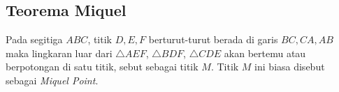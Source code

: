 \subsection{Teorema Miquel}
    Pada segitiga $ABC$, titik $D,E,F$ berturut-turut berada di garis $BC,CA,AB$ maka lingkaran luar dari $\triangle AEF$, $\triangle  BDF$, $\triangle CDE$ akan bertemu atau berpotongan di satu titik, sebut sebagai titik $M$. Titik $M$ ini biasa disebut sebagai \textit{Miquel Point}.

